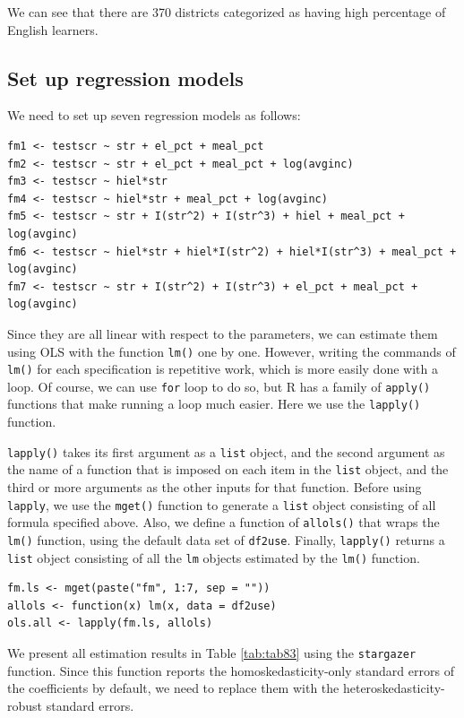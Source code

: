 \documentclass[11pt]{article}
\begin{document}
We can see that there are 370 districts categorized as having high
percentage of English learners.

\subsection*{Set up regression models}
\label{sec:org8e79bc6}

We need to set up seven regression models as follows:
\begin{verbatim}
fm1 <- testscr ~ str + el_pct + meal_pct
fm2 <- testscr ~ str + el_pct + meal_pct + log(avginc)
fm3 <- testscr ~ hiel*str
fm4 <- testscr ~ hiel*str + meal_pct + log(avginc)
fm5 <- testscr ~ str + I(str^2) + I(str^3) + hiel + meal_pct + log(avginc)
fm6 <- testscr ~ hiel*str + hiel*I(str^2) + hiel*I(str^3) + meal_pct + log(avginc)
fm7 <- testscr ~ str + I(str^2) + I(str^3) + el_pct + meal_pct + log(avginc)
\end{verbatim}

Since they are all linear with respect to the parameters, we can
estimate them using OLS with the function \texttt{lm()} one by one. However,
writing the commands of \texttt{lm()} for each specification is repetitive
work, which is more easily done with a loop. Of course, we can use
\texttt{for} loop to do so, but R has a family of \texttt{apply()} functions that make
running a loop much easier. Here we use the \texttt{lapply()} function.

\texttt{lapply()} takes its first argument as a \texttt{list} object, and the second
argument as the name of a function that is imposed on each item in the
\texttt{list} object, and the third or more arguments as the other inputs for
that function. Before using \texttt{lapply}, we use the \texttt{mget()} function to
generate a \texttt{list} object consisting of all formula specified
above. Also, we define a function of \texttt{allols()} that wraps the \texttt{lm()}
function, using the default data set of \texttt{df2use}. Finally, \texttt{lapply()}
returns a \texttt{list} object consisting of all the \texttt{lm} objects estimated
by the \texttt{lm()} function.

\begin{verbatim}
fm.ls <- mget(paste("fm", 1:7, sep = ""))
allols <- function(x) lm(x, data = df2use)
ols.all <- lapply(fm.ls, allols)
\end{verbatim}

We present all estimation results in Table \ref{tab:tab83} using the
\texttt{stargazer} function. Since this function reports the homoskedasticity-only
standard errors of the coefficients by default, we need to replace
them with the heteroskedasticity-robust standard errors.
\end{document}
